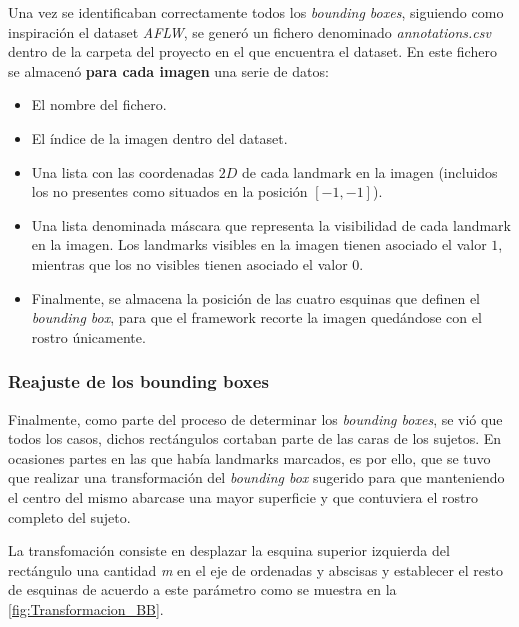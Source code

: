             \noindent Una vez se identificaban correctamente todos los \textit{bounding boxes}, siguiendo como inspiración el dataset \textit{AFLW}, se generó un fichero denominado \textit{annotations.csv} dentro de la carpeta del proyecto en el que encuentra el dataset. En este fichero se almacenó \textbf{para cada imagen} una serie de datos: 

            \begin{itemize}
                \item El nombre del fichero.
                \item El índice de la imagen dentro del dataset. 
                \item Una lista con las coordenadas $2D$ de cada landmark en la imagen (incluidos los no presentes como situados en la posición $[-1,-1]$). 
                \item Una lista denominada máscara que representa la visibilidad de cada landmark en la imagen. Los landmarks visibles en la imagen tienen asociado el valor $1$, mientras que los no visibles tienen asociado el valor $0$.
                \item Finalmente, se almacena la posición de las cuatro esquinas que definen el \textit{bounding box}, para que el framework recorte la imagen quedándose con el rostro únicamente. 
            \end{itemize}

        \subsubsection{Reajuste de los bounding boxes}
            \noindent Finalmente, como parte del proceso de determinar los \textit{bounding boxes}, se vió que todos los casos, dichos rectángulos cortaban parte de las caras de los sujetos. En ocasiones partes en las que había landmarks marcados, es por ello, que se tuvo que realizar una transformación del \textit{bounding box} sugerido para que manteniendo el centro del mismo abarcase una mayor superficie y que contuviera el rostro completo del sujeto. 

            \medskip

            \noindent La transfomación consiste en desplazar la esquina superior izquierda del rectángulo una cantidad \textit{m} en el eje de ordenadas y abscisas y establecer el resto de esquinas de acuerdo a este parámetro como se muestra en la \autoref{fig:Transformacion_BB}.


